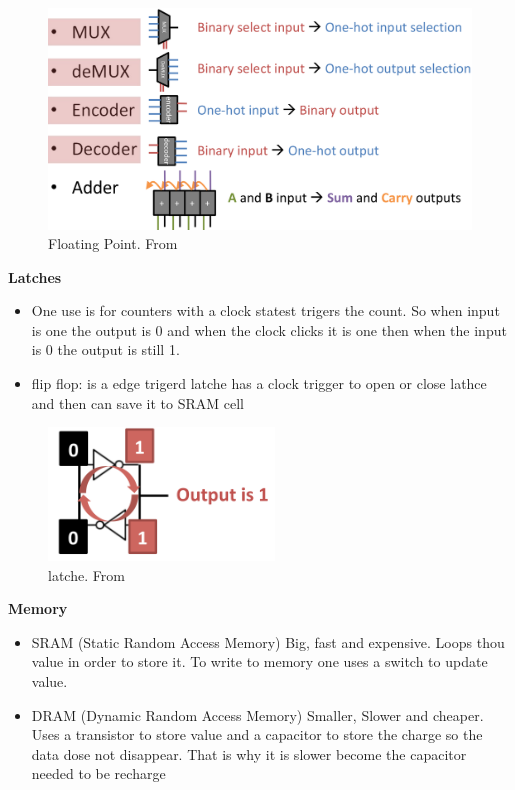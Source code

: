\begin{figure}[H]
    \centering
    \includegraphics[width=16cm]{image/important-logic-blocks.png} 
    \caption{Floating Point. From \cite{ca}}
\end{figure}

\textbf{Latches}
\begin{itemize}
\item  One use is for counters with a clock statest trigers the count.
  So when input is one the output is 0 and when the clock clicks it is one then when the input is
  0 the output is still 1.
\item flip flop: is a edge trigerd latche has a clock trigger to open or close lathce and then can save it to SRAM cell
\end{itemize}

\begin{figure}[H]
    \centering
    \includegraphics[width=6cm]{image/latche.png} 
    \caption{latche. From \cite{ca}}
\end{figure}

\textbf{Memory}
\begin{itemize}
\item  SRAM (Static Random Access Memory) Big, fast and expensive. Loops thou value in order to store it.
  To write to memory one uses a switch to update value.
\item  DRAM (Dynamic Random Access Memory) Smaller, Slower and cheaper. Uses a transistor to store value
  and a capacitor to store the charge so the data dose not disappear.
  That is why it is slower become the capacitor needed to be recharge
\end{itemize}



